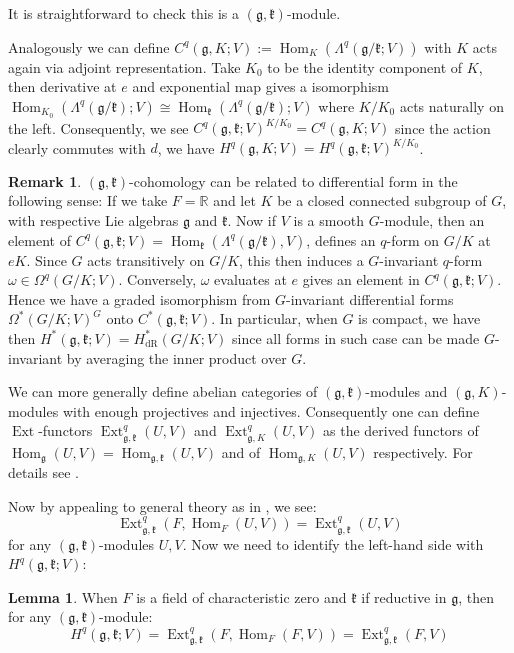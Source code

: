 \documentclass[11pt]{report}
\theoremstyle{definition}
\newtheorem{Lemma}[Def]{Lemma}
\newtheorem{Rmk}{Remark}[chapter]
\theoremstyle{plain}
\DeclareMathOperator{\Ext}{Ext}
\DeclareMathOperator{\Hom}{Hom}
\newcommand{\real}{\mathbb{R}}
\newcommand{\Lie}[1]{\mathfrak{#1}}
\begin{document}
It is straightforward to check this is a $(\Lie{g}, \Lie{k})$-module.
\par Analogously we can define $C^q(\Lie{g}, K;V):=\Hom_K(\Lambda^q(\Lie{g}/\Lie{k};V))$ with $K$ acts again via adjoint representation. Take $K_0$ to be the identity component of $K$, then derivative at $e$ and exponential map gives a isomorphism $\Hom_{K_0}(\Lambda^q(\Lie{g}/\Lie{k});V)\cong \Hom_{\Lie{k}}(\Lambda^q(\Lie{g}/\Lie{k});V)$ where $K/K_0$ acts naturally on the left. Consequently, we see $C^q(\Lie{g},\Lie{k};V)^{K/K_0}=C^q(\Lie{g},K;V)$ since the action clearly commutes with $d$, we have $H^q(\Lie{g}, K;V)=H^q(\Lie{g}, \Lie{k};V)^{K/K_0}$.
\begin{Rmk}
	$(\Lie{g}, \Lie{k})$-cohomology can be related to differential form in the following sense: If we take $F=\real$ and let $K$ be a closed connected subgroup of $G$, with respective Lie algebras $\Lie{g}$ and $\Lie{k}$. Now if $V$ is a smooth $G$-module, then an element of $C^q(\Lie{g}, \Lie{k};V)=\Hom_{\Lie{k}}(\Lambda^q(\Lie{g}/\Lie{k}), V)$, defines an $q$-form on $G/K$ at $eK$. Since $G$ acts transitively on $G/K$, this then induces a $G$-invariant $q$-form $\omega\in \Omega^q(G/K; V)$. Conversely, $\omega$ evaluates at $e$ gives an element in $C^q(\Lie{g}, \Lie{k};V)$. Hence we have a graded isomorphism from $G$-invariant differential forms $\Omega^*(G/K;V)^G$ onto $C^*(\Lie{g}, \Lie{k};V)$. In particular, when $G$ is compact, we have then $H^*(\Lie{g}, \Lie{k};V)=H^*_{\mathrm{dR}}(G/K;V)$ since all forms in such case can be made $G$-invariant by averaging the inner product over $G$.
\end{Rmk}
We can more generally define abelian categories of $(\Lie{g}, \Lie{k})$-modules and $(\Lie{g}, K)$-modules with enough projectives and injectives. Consequently one can define $\Ext$-functors $\Ext^q_{\Lie{g},\Lie{k}}(U,V)$ and $\Ext_{\Lie{g}, K}^q(U,V)$ as the derived functors of $\Hom_\Lie{g}(U,V)=\Hom_{\Lie{g}, \Lie{k}}(U,V)$ and of $\Hom_{\Lie{g}, K}(U,V)$ respectively. For details see \cite[Chapter~1, \S 2]{borel2013}.
\par Now by appealing to general theory as in \cite[Chapter~IX, Corollary~4.4]{cartan2016}, we see:
\begin{equation}\label{cartan identity}
\Ext^q_{\Lie{g},\Lie{k}}(F, \Hom_F(U,V))=\Ext^q_{\Lie{g},\Lie{k}}(U,V)
\end{equation}
for any $(\Lie{g}, \Lie{k})$-modules $U, V$. Now we need to identify the left-hand side with $H^q(\Lie{g}, \Lie{k};V)$:
\begin{Lemma}\label{borel1.2.5}
	When $F$ is a field of characteristic zero and $\Lie{k}$ if reductive in $\Lie{g}$, then for any $(\Lie{g}, \Lie{k})$-module:
\begin{equation}
H^q(\Lie{g}, \Lie{k};V)=\Ext^q_{\Lie{g},\Lie{k}}(F, \Hom_F(F,V))=\Ext^q_{\Lie{g},\Lie{k}}(F,V)
\end{equation}
\end{Lemma}
\end{document}
